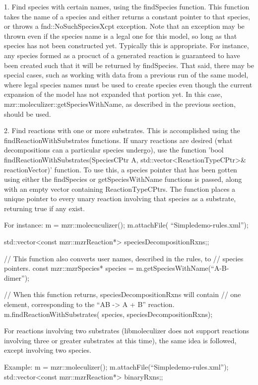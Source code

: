 1.
Find species with certain names, using the findSpecies function.  This
function takes the name of a species and either returns a constant
pointer to that species, or throws a fnd::NoSuchSpeciesXcpt
exception.  Note that an exception may be thrown even if the species
name is a legal one for this model, so long as that species has not
been constructed yet.  Typically this is appropriate.  For instance,
any species formed as a procuct of a generated reaction is guaranteed
to have been created such that it will be returned by findSpecies.
That said, there may be special cases, such as working with data from
a previous run of the same model, where legal species names must be
used to create species even though the current expansion of the model
has not expanded that portion yet.  In this case,
mzr::moleculizer::getSpeciesWithName, as described in the previous
section, should be used.  

2.  Find reactions with one or more substrates.
This is accomplished using the findReactionWithSubstrates functions.
If unary reactions are desired (what decompositions can a particular
species undergo), use the function 'bool
findReactionWithSubstrates(SpeciesCPtr A,
std::vector<ReactionTypeCPtr>& reactionVector)' function.  To use
this, a species pointer that has been gotten using either the
findSpecies or getSpeciesWithName functions is passed, along with an
empty vector containing ReactionTypeCPtrs.  The function places a
unique pointer to every unary reaction involving that species as a
substrate, returning true if any exist.  

For instance:
m = mzr::molecuculizer();
m.attachFile( ``Simpledemo-rules.xml''); 

std::vector<const mzr::mzrReaction*> speciesDecompositionRxns;;

// This function also converts user names, described in the rules, to
// species pointers.
const mzr::mzrSpecies* species = m.getSpeciesWithName(``A-B-dimer'');

// When this function returns, speciesDecompositionRxns will contain
// one element, corresponding to the ``AB -> A + B'' reaction.  
m.findReactionWithSubstrates( species, speciesDecompositionRxns);

For reactions involving two substrates (libmoleculizer does not
support reactions involving three or greater substrates at this time),
the same idea is followed, except involving two species.  

Example:
m = mzr::moleculizer();
m.attachFile(``Simpledemo-rules.xml'');
std::vector<const mzr::mzrReaction*> binaryRxns;;

